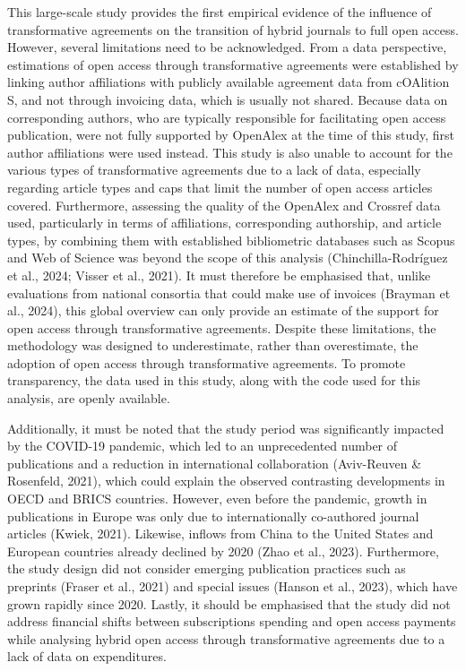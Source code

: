 \documentclass[a4paper,man,floatsintext,longtable,noextraspace,12pt]{apa6}
\begin{document}
This large-scale study provides the first empirical evidence of the
influence of transformative agreements on the transition of hybrid
journals to full open access. However, several limitations need to be
acknowledged. From a data perspective, estimations of open access
through transformative agreements were established by linking author
affiliations with publicly available agreement data from cOAlition S,
and not through invoicing data, which is usually not shared. Because
data on corresponding authors, who are typically responsible for
facilitating open access publication, were not fully supported by
OpenAlex at the time of this study, first author affiliations were used
instead. This study is also unable to account for the various types of
transformative agreements due to a lack of data, especially regarding
article types and caps that limit the number of open access articles
covered. Furthermore, assessing the quality of the OpenAlex and Crossref
data used, particularly in terms of affiliations, corresponding
authorship, and article types, by combining them with established
bibliometric databases such as Scopus and Web of Science was beyond the
scope of this analysis (Chinchilla-Rodríguez et al., 2024; Visser et
al., 2021). It must therefore be emphasised that, unlike evaluations
from national consortia that could make use of invoices (Brayman et al.,
2024), this global overview can only provide an estimate of the support
for open access through transformative agreements. Despite these
limitations, the methodology was designed to underestimate, rather than
overestimate, the adoption of open access through transformative
agreements. To promote transparency, the data used in this study, along
with the code used for this analysis, are openly available.

Additionally, it must be noted that the study period was significantly
impacted by the COVID-19 pandemic, which led to an unprecedented number
of publications and a reduction in international collaboration
(Aviv-Reuven \& Rosenfeld, 2021), which could explain the observed
contrasting developments in OECD and BRICS countries. However, even
before the pandemic, growth in publications in Europe was only due to
internationally co-authored journal articles (Kwiek, 2021). Likewise,
inflows from China to the United States and European countries already
declined by 2020 (Zhao et al., 2023). Furthermore, the study design did
not consider emerging publication practices such as preprints (Fraser et
al., 2021) and special issues (Hanson et al., 2023), which have grown
rapidly since 2020. Lastly, it should be emphasised that the study did
not address financial shifts between subscriptions spending and open
access payments while analysing hybrid open access through
transformative agreements due to a lack of data on expenditures.
\end{document}
